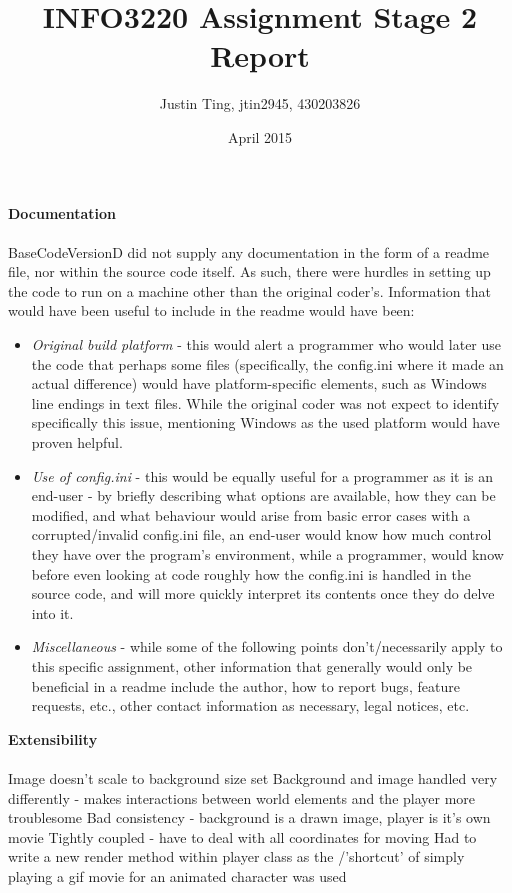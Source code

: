 \documentclass[12pt]{article}
\title{INFO3220 Assignment Stage 2 Report}
\author{Justin Ting, jtin2945, 430203826}
\date{April 2015}
\begin{document}
\maketitle

\textbf{Documentation}\\\\
BaseCodeVersionD did not supply any documentation in the form of a readme file, nor within the source code itself. As such, there were hurdles in setting up the code to run on a machine other than the original coder's. Information that would have been useful to include in the readme would have been:\\
\begin{itemize}
\item \textit{Original build platform} - this would alert a programmer who would later use the code that perhaps some files (specifically, the config.ini where it made an actual difference) would have platform-specific elements, such as Windows line endings in text files. While the original coder was not expect to identify specifically this issue, mentioning Windows as the used platform would have proven helpful.
\item \textit{Use of config.ini} - this would be equally useful for a programmer as it is an end-user - by briefly describing what options are available, how they can be modified, and what behaviour would arise from basic error cases with a corrupted/invalid config.ini file, an end-user would know how much control they have over the program's environment, while a programmer, would know before even looking at code roughly how the config.ini is handled in the source code, and will more quickly interpret its contents once they do delve into it.
\item \textit{Miscellaneous} - while some of the following points don't/necessarily apply to this specific assignment, other information that generally would only be beneficial in a readme include the author, how to report bugs, feature requests, etc., other contact information as necessary, legal notices, etc.
\end{itemize}

\textbf{Extensibility}\\\\
        Image doesn't scale to background size set
        Background and image handled very differently - makes interactions between world elements and the player more troublesome
        Bad consistency - background is a drawn image, player is it's own movie
        Tightly coupled - have to deal with all coordinates for moving
        Had to write a new render method within player class as the /'shortcut' of simply playing a gif movie for an animated character was used
\end{document}
